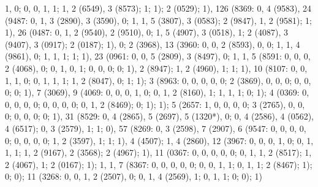 {1, 0; 0, 0, 1, 1; 1, 2 (6549), 3 (8573); 1; 1); 2 (0529); 1), 126 (8369: 0, 4 (9583), 24 (9487: 0, 1, 3 (2890), 3 (3590), 0; 1, 1, 5 (3807), 3 (0583); 2 (9847), 1, 2 (9581); 1; 1), 26 (0487: 0, 1, 2 (9540), 2 (9510), 0; 1, 5 (4907), 3 (0518), 1; 2 (4087), 3 (9407), 3 (0917); 2 (0187); 1), 0; 2 (3968), 13 (3960: 0, 0, 2 (8593), 0, 0; 1, 1, 4 (9861), 0; 1, 1, 1; 1; 1), 23 (0961: 0, 0, 5 (2809), 3 (8497), 0; 1, 1, 5 (8591: 0, 0, 0, 2 (4068), 0; 0, 1, 0, 1; 0, 0, 0; 0; 1), 2 (8947); 1, 2 (4960), 1; 1; 1), 10 (8107: 0, 0, 1, 1, 0; 0, 1, 1, 1; 1, 2 (8047), 0; 1; 1); 3 (8963: 0, 0, 0, 0, 0; 2 (3869), 0, 0, 0; 0, 0, 0; 0; 1), 7 (3069), 9 (4069: 0, 0, 0, 1, 0; 0, 1, 2 (8160), 1; 1, 1, 1; 0; 1); 4 (0369: 0, 0, 0, 0, 0; 0, 0, 0, 0; 0, 1, 2 (8469); 0; 1); 1); 5 (2657: 1, 0, 0, 0, 0; 3 (2765), 0, 0, 0; 0, 0, 0; 0; 1), 31 (8529: 0, 4 (2865), 5 (2697), 5 (1320*), 0; 0, 4 (2586), 4 (0562), 4 (6517); 0, 3 (2579), 1; 1; 0), 57 (8269: 0, 3 (2598), 7 (2907), 6 (9547: 0, 0, 0, 0, 0; 0, 0, 0, 0; 1, 2 (3597), 1; 1; 1), 4 (4507); 1, 4 (2860), 12 (3967: 0, 0, 0, 1, 0; 0, 1, 1, 1; 1, 2 (9167), 2 (3568); 2 (4967); 1), 11 (0367: 0, 0, 0, 0, 0; 0, 1, 1, 2 (8517); 1, 2 (4067), 1; 2 (0167); 1); 1, 1, 7 (8367: 0, 0, 0, 0, 0; 0, 0, 1, 1; 0, 1, 1; 2 (8467); 1); 0; 0); 11 (3268: 0, 0, 1, 2 (2507), 0; 0, 1, 4 (2569), 1; 0, 1, 1; 0; 0); 1)

}
